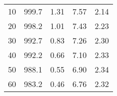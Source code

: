 \begin{table}[h!]
\begin{tabular}{@{}ccccc@{}}
        10                                                                  & 999.7                                                                & 1.31                                                                               & 7.57                                                                             & 2.14                                                                               \\
        20                                                                  & 998.2                                                                & 1.01                                                                               & 7.43                                                                             & 2.23                                                                               \\
        30                                                                  & 992.7                                                                & 0.83                                                                               & 7.26                                                                             & 2.30                                                                               \\
        40                                                                  & 992.2                                                                & 0.66                                                                               & 7.10                                                                             & 2.33                                                                               \\
        50                                                                  & 988.1                                                                & 0.55                                                                               & 6.90                                                                             & 2.34                                                                               \\
        60                                                                  & 983.2                                                                & 0.46                                                                               & 6.76                                                                             & 2.32                                                                               \\

\end{tabular}
\end{table}
